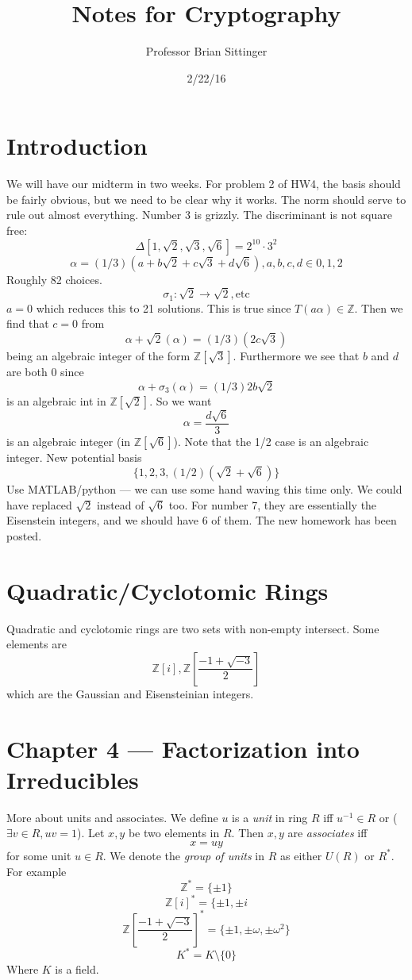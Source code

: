 \documentclass{article}
\title{Notes for Cryptography}
\author{Professor Brian Sittinger}
\date{2/22/16}
\begin{document}
\maketitle
\section{Introduction}
We will have our midterm in two weeks. For problem 2 of HW4, the basis should be
fairly obvious, but we need to be clear why it works. The norm should serve to
rule out almost everything. Number 3 is grizzly. The discriminant is not square
free: 
\[ \Delta[1, \sqrt{2},\sqrt{3},\sqrt{6}]  = 2^{10}\cdot 3^2 \]
\[ \alpha = (1/3) (a+b\sqrt{2} +c\sqrt{3}+d\sqrt{6}),a,b,c,d \in {0,1,2} \]
Roughly 82 choices. 
\[ \sigma_1: \sqrt{2} \rightarrow \sqrt{2}, \text{etc}\]
$a = 0$ which reduces this to 21 solutions. This is true since $T(a\alpha)  \in
\mathbb{Z}$. Then we find that $c = 0$ from
\[ \alpha + \sqrt{2}(\alpha) = (1/3)(2c\sqrt{3}) \]
being an algebraic integer of the form $\mathbb{Z}[\sqrt{3}]$. Furthermore we
see that $b$ and $d$ are both 0 since
\[ \alpha + \sigma_3(\alpha) = (1/3)2b\sqrt{2} \]
is an algebraic int in $\mathbb{Z}[\sqrt{2}]$. So we want
\[ \alpha = \frac{d \sqrt{6}}{3} \] is an algebraic integer (in
$\mathbb{Z}[\sqrt{6}]$). Note that the 1/2 case is an algebraic integer. 
New potential basis
\[ \{1,2,3,(1/2)(\sqrt{2}+\sqrt{6}) \} \]
Use MATLAB/python --- we can use some hand waving this time only. We could have
replaced $\sqrt{2}$ instead of $\sqrt{6}$ too. For number 7, they are
essentially the Eisenstein integers, and we should have 6 of them. The new
homework has been posted. 

\section{Quadratic/Cyclotomic Rings}
Quadratic and cyclotomic rings are two sets with non-empty intersect. Some
elements are 
\[ \mathbb{Z}[i], \mathbb{Z}\left[\frac{-1+\sqrt{-3}}{2}\right] \]
which are the Gaussian and Eisensteinian integers. 

\section{Chapter 4 --- Factorization into Irreducibles}
More about units and associates. We define $u$ is a \emph{unit} in ring $R$ iff $u^{-1}
\in R$ or ($\exists v \in R, uv = 1$). Let $x,y$ be two elements in $R$. Then
$x,y$ are \emph{associates} iff 
\[ x = uy \]
for some unit $u \in R$. We denote the \emph{group of units} in $R$ as either
$U(R)$ or $R^*$. For example
\[ \mathbb{Z}^* = \{\pm1\} \]
\[ \mathbb{Z}[i]^* = \{ \pm1, \pm i \]
\[ \mathbb{Z}\left[\frac{-1+\sqrt{-3}}{2}\right]^* = \{ \pm1, \pm \omega, \pm
\omega^2\} \]
\[ K^* = K\setminus \{0\} \]
Where $K$ is a field.
\end{document}
